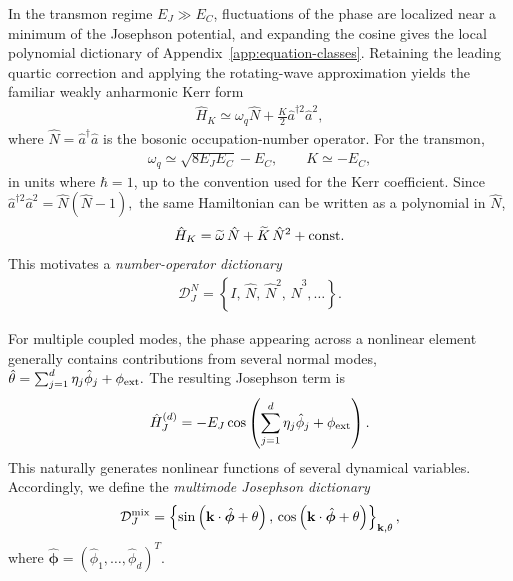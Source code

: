 \documentclass[pra,twocolumn,superscriptaddress,nofootinbib,floatfix]{revtex4-2}
\theoremstyle{remark}
\begin{document}
In the transmon regime \(E_J\gg E_C\), fluctuations of the phase are localized near a minimum of the Josephson potential, and expanding the cosine gives the local polynomial dictionary of Appendix~\ref{app:equation-classes}.
Retaining the leading quartic correction and applying the rotating-wave approximation yields the familiar weakly anharmonic Kerr form
\begin{align}
\hat H_K\simeq\omega_q \hat N+\frac{K}{2}\hat a^{\dagger 2}\hat a^2,
\label{eq:kerr-hamiltonian}
\end{align}
where
$\hat N=\hat a^\dagger\hat a$
is the bosonic occupation-number operator. For the transmon,
\begin{align}
\omega_q\simeq\sqrt{8E_JE_C}-E_C,\qquad K\simeq -E_C,
\end{align}
in units where \(\hbar=1\), up to the convention used for the Kerr coefficient. Since
\(\hat a^{\dagger 2}\hat a^2=\hat N(\hat N-1),\)
the same Hamiltonian can be written as a polynomial in \(\hat N\),
\begin{align}
\hat H_K=\widetilde\omega\,\hat N+\widetilde K\,\hat N^2+{\rm const.}
\end{align}
This motivates a \emph{number-operator dictionary}
\begin{align}
\mathcal D_{J}^{N}=\left\{I,\,\hat N,\,\hat N^2,\,\hat N^3,\ldots\right\}.
\label{eq:number-dictionary}
\end{align}

For multiple coupled modes, the phase appearing across a nonlinear element generally contains contributions from several normal modes,
\(\hat\theta=\sum_{j=1}^{d}\eta_j\hat\phi_j+\phi_{\rm ext}.\)
The resulting Josephson term is
\begin{align}
\hat H_J^{(d)}=-E_J\cos\left(\sum_{j=1}^{d}\eta_j\hat\phi_j+\phi_{\rm ext}\right).
\label{eq:multimode-josephson}
\end{align}
This naturally generates nonlinear functions of several dynamical variables. Accordingly, we define the \emph{multimode Josephson dictionary}
\begin{align}
\mathcal D_{J}^{\rm mix}=\left\{\sin\left(\mathbf k\cdot\hat{\boldsymbol\phi}+\theta\right),\,\cos\left(\mathbf k\cdot\hat{\boldsymbol\phi}+\theta\right)\right\}_{\mathbf k,\theta},
\label{eq:multimode-dictionary}
\end{align}
where
$\hat{\boldsymbol\phi}=(\hat\phi_1,\ldots,\hat\phi_d)^T.$
\end{document}
